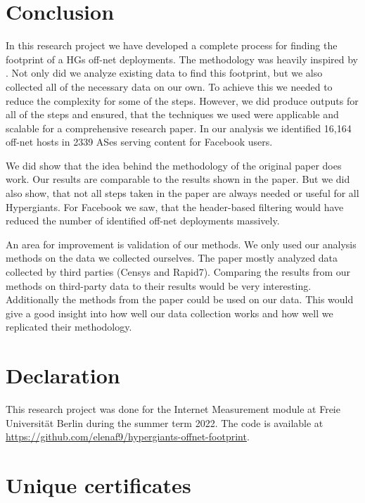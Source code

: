 \documentclass[sigconf,10pt,nonacm]{acmart}
\begin{document}
\section{Conclusion}

In this research project we have developed a complete process for finding the footprint of a HGs off-net deployments. The methodology was heavily inspired by \cite{gigis_seven_2021}. Not only did we analyze existing data to find this footprint, but we also collected all of the necessary data on our own. To achieve this we needed to reduce the complexity for some of the steps. However, we did produce outputs for all of the steps and ensured, that the techniques we used were applicable and scalable for a comprehensive research paper. In our analysis we identified 16,164 off-net hosts in 2339 ASes serving content for Facebook users.

We did show that the idea behind the methodology of the original paper does work. Our results are comparable to the results shown in the paper. But we did also show, that not all steps taken in the paper are always needed or useful for all Hypergiants. For Facebook we saw, that the header-based filtering would have reduced the number of identified off-net deployments massively.

An area for improvement is validation of our methods. We only used our analysis methods on the data we collected ourselves. The paper mostly analyzed data collected by third parties (Censys and Rapid7). Comparing the results from our methods on third-party data to their results would be very interesting. Additionally the methods from the paper could be used on our data. This would give a good insight into how well our data collection works and how well we replicated their methodology.

\section{Declaration}

This research project was done for the Internet Measurement module at Freie Universität Berlin during the summer term 2022. The code is available at \url{https://github.com/elenaf9/hypergiants-offnet-footprint}.





\appendix

\section{Unique certificates}
\label{sec:unique_certificates}
\end{document}
